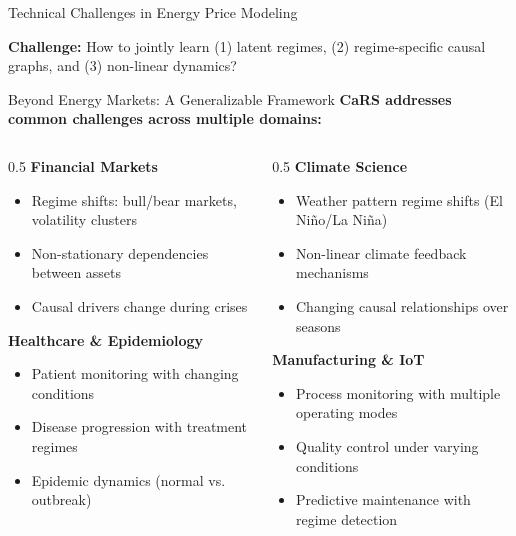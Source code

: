 \documentclass[aspectratio=169]{beamer}
\begin{document}
\begin{frame}{Technical Challenges in Energy Price Modeling}
\vspace{0.3cm}
\begin{center}
\textcolor{warnred}{\textbf{Challenge:}} How to jointly learn (1) latent regimes, (2) regime-specific causal graphs, and (3) non-linear dynamics?
\end{center}
\end{frame}

\begin{frame}{Beyond Energy Markets: A Generalizable Framework}
\textbf{CaRS addresses common challenges across multiple domains:}

\vspace{0.3cm}
\begin{columns}
\begin{column}{0.5\textwidth}
\textbf{Financial Markets}
\begin{itemize}
    \item Regime shifts: bull/bear markets, volatility clusters
    \item Non-stationary dependencies between assets
    \item Causal drivers change during crises
\end{itemize}

\vspace{0.2cm}
\textbf{Healthcare \& Epidemiology}
\begin{itemize}
    \item Patient monitoring with changing conditions
    \item Disease progression with treatment regimes
    \item Epidemic dynamics (normal vs. outbreak)
\end{itemize}
\end{column}

\begin{column}{0.5\textwidth}
\textbf{Climate Science}
\begin{itemize}
    \item Weather pattern regime shifts (El Ni\~{n}o/La Ni\~{n}a)
    \item Non-linear climate feedback mechanisms
    \item Changing causal relationships over seasons
\end{itemize}

\vspace{0.2cm}
\textbf{Manufacturing \& IoT}
\begin{itemize}
    \item Process monitoring with multiple operating modes
    \item Quality control under varying conditions
    \item Predictive maintenance with regime detection
\end{itemize}
\end{column}
\end{columns}


\end{frame}
\end{document}
